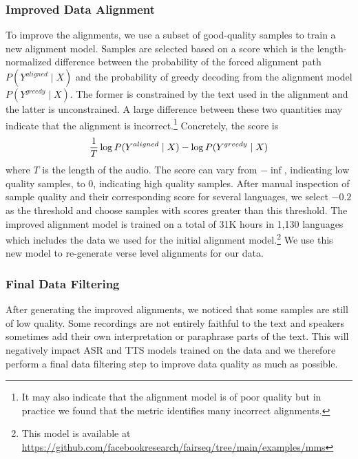 \subsubsection{Improved Data Alignment}
\label{sec:data-align2}

To improve the alignments, we use a subset of good-quality samples to train a new alignment model.
Samples are selected based on a score which is the length-normalized difference between the probability of the forced alignment path $P(Y^{aligned} \mid X)$ and the probability of greedy decoding from the alignment model $P(Y^{greedy} \mid X)$.  
The former is constrained by the text used in the alignment and the latter is unconstrained. 
A large difference between these two quantities may indicate that the alignment is incorrect.\footnote{It may also indicate that the alignment model is of poor quality but in practice we found that the metric identifies many incorrect alignments.}
Concretely, the score is 
\begin{equation}
    \centering
      \frac{1}{T} \log P(Y^{aligned} \mid X) - \log P(Y^{greedy} \mid X)
\end{equation}
where $T$ is the length of the audio.
The score can vary from $-\inf$, indicating low quality samples, to $0$, indicating high quality samples. 
After manual inspection of sample quality and their corresponding score for several languages, we select $-0.2$ as the threshold and choose samples with scores greater than this threshold.
The improved alignment model is trained on a total of 31K hours in 1,130 languages which includes the data we used for the initial alignment model.\footnote{This model is available at \url{https://github.com/facebookresearch/fairseq/tree/main/examples/mms}}
We use this new model to re-generate verse level alignments for our data. 



\subsubsection{Final Data Filtering}
\label{sec:data-cross-val}

After generating the improved alignments, we noticed that some samples are still of low quality.
Some recordings are not entirely faithful to the text and speakers sometimes add their own interpretation or paraphrase parts of the text. 
This will negatively impact ASR and TTS models trained on the data and we therefore perform a final data filtering step to improve data quality as much as possible.

